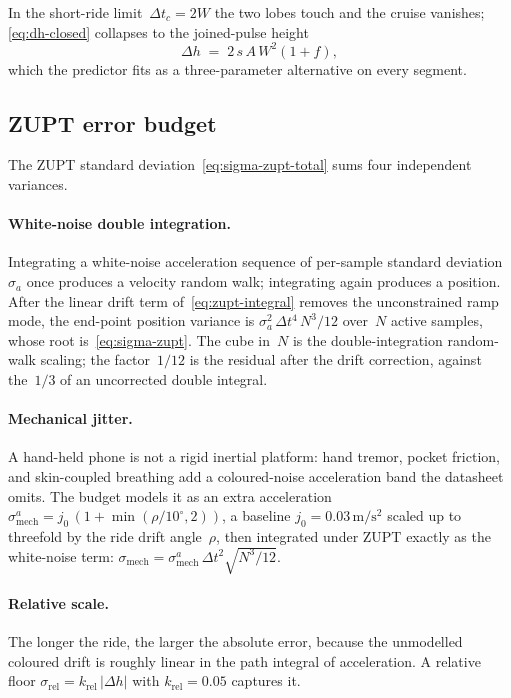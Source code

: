 \documentclass[manuscript,review,screen]{acmart}
\begin{document}
In the short-ride limit~$\Delta t_c\!=\!2W$ the two lobes touch and
the cruise vanishes; \eqref{eq:dh-closed} collapses to the joined-pulse
height
\begin{equation}
  \Delta h \;=\; 2\,s\,A\,W^{2}(1+f),
  \label{eq:dh-joined}
\end{equation}
which the predictor fits as a three-parameter alternative on every
segment.

\subsection{ZUPT error budget}
\label{app:pred-zupt-error}

The ZUPT standard deviation~\eqref{eq:sigma-zupt-total} sums four
independent variances.

\paragraph{White-noise double integration.}
Integrating a white-noise acceleration sequence of per-sample
standard deviation~$\sigma_a$ once produces a velocity random walk;
integrating again produces a position.  After the linear drift term
of~\eqref{eq:zupt-integral} removes the unconstrained ramp mode, the
end-point position variance is $\sigma_a^{2}\,\Delta t^{4}\,N^{3}/12$
over~$N$ active samples, whose root is~\eqref{eq:sigma-zupt}.  The
cube in~$N$ is the double-integration random-walk scaling; the
factor~$1/12$ is the residual after the drift correction, against
the~$1/3$ of an uncorrected double integral.

\paragraph{Mechanical jitter.}
A hand-held phone is not a rigid inertial platform: hand tremor,
pocket friction, and skin-coupled breathing add a coloured-noise
acceleration band the datasheet omits.  The budget models it as an
extra acceleration~$\sigma_{\mathrm{mech}}^{a}
=j_0\,(1+\min(\rho/10^{\circ},2))$, a baseline
$j_0=0.03\,\mathrm{m/s^2}$ scaled up to threefold by the ride drift
angle~$\rho$, then integrated under ZUPT exactly as the white-noise
term: $\sigma_{\mathrm{mech}}
=\sigma_{\mathrm{mech}}^{a}\,\Delta t^{2}\sqrt{N^{3}/12}$.

\paragraph{Relative scale.}
The longer the ride, the larger the absolute error, because the
unmodelled coloured drift is roughly linear in the path integral of
acceleration.  A relative floor $\sigma_{\mathrm{rel}}
=k_{\mathrm{rel}}\,|\Delta h|$ with $k_{\mathrm{rel}}=0.05$ captures
it.
\end{document}
